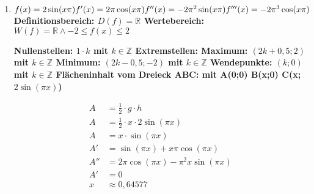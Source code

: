 \begin{enumerate}
\item %
  
  
     $f(x)=2\sin(x\pi) \newline
 f'(x)=2\pi \cos(x\pi)  \newline
 f''(x)=-2\pi^2\sin(x\pi)\newline
 f'''(x)=-2\pi^3\cos(x\pi) \newline$
 \bfseries Definitionsbereich: \normalfont $D(f)=\mathbb{R}$ \newline
 \bfseries Wertebereich: \normalfont $W(f)=\mathbb{R} \wedge -2\leq f(x) \leq 2$ \newline
 
 \bfseries Nullenstellen: \normalfont $1 \cdot k$ mit $k \in \mathbb{Z}$\newline
 \bfseries Extremstellen: \normalfont \newline
 Maximum: $(2k+0,5;2)$  mit $k \in \mathbb{Z}$ \newline
 Minimum: $(2k-0,5;-2)$ mit $k \in \mathbb{Z}$ \newline
  \bfseries Wendepunkte: \normalfont $(k;0)$  mit $ k \in \mathbb{Z}$\newline
  \newline
  Fl\"acheninhalt vom Dreieck ABC:\newline
  mit A(0;0) B(x;0) C(x;$2\sin (\pi x)$) \newline
  
  \begin{align*}
  A &= \frac{1}{2} \cdot g \cdot h \\
  A &= \frac{1}{2} \cdot x \cdot 2\sin (\pi x)  \\
  A &= x \cdot \sin (\pi x) \\
  A' &= \sin(\pi x)+x \pi \cos(\pi x)\\
  A'' &= 2 \pi \cos (\pi x) - \pi^2 x \sin(\pi x) \\
  A' &=0 \\
  x &\approx 0,64577 \\
  \end{align*}
  
  \end{enumerate} 